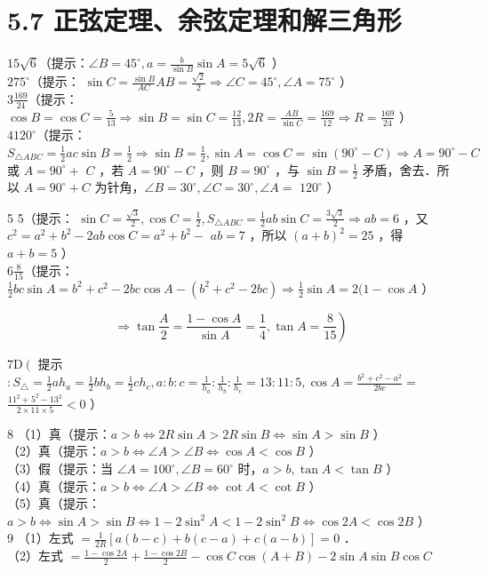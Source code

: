 \documentclass[10pt]{article}
\begin{document}
\section*{5.7 正弦定理、余弦定理和解三角形}
\(15 \sqrt{6}\)（提示：\(\angle B=45^{\circ}, a=\frac{b}{\sin B} \sin A=5 \sqrt{6}\) ）\\
\(275^{\circ}\)（提示： \(\sin C=\frac{\sin B}{A C} A B=\frac{\sqrt{2}}{2} \Rightarrow \angle C=45^{\circ}, \angle A=75^{\circ}\) ）\\
\(3 \frac{169}{24}\)（提示： \(\cos B=\cos C=\frac{5}{13} \Rightarrow \sin B=\sin C=\frac{12}{13}, 2 R=\frac{A B}{\sin C}=\frac{169}{12} \Rightarrow R=\frac{169}{24}\) ）\\
\(4120^{\circ}\)（提示：\(S_{\triangle A B C}=\frac{1}{2} a c \sin B=\frac{1}{2} \Rightarrow \sin B=\frac{1}{2}, \sin A=\cos C=\sin \left(90^{\circ}-C\right) \Rightarrow A=90^{\circ}-C\) 或 \(A=90^{\circ}+\) \(C\) ，若 \(A=90^{\circ}-C\) ，则 \(B=90^{\circ}\) ，与 \(\sin B=\frac{1}{2}\) 矛盾，舍去．所以 \(A=90^{\circ}+C\) 为针角，\(\angle B=30^{\circ}, \angle C=30^{\circ}, \angle A=\) \(120^{\circ}\) ）

5 5（提示： \(\sin C=\frac{\sqrt{3}}{2}, \cos C=\frac{1}{2}, S_{\triangle A B C}=\frac{1}{2} a b \sin C=\frac{3 \sqrt{3}}{2} \Rightarrow a b=6\) ，又 \(c^{2}=a^{2}+b^{2}-2 a b \cos C=a^{2}+b^{2}-\) \(a b=7\) ，所以 \((a+b)^{2}=25\) ，得 \(a+b=5\) ）\\
\(6 \frac{8}{15}\)（提示：\(\frac{1}{2} b c \sin A=b^{2}+c^{2}-2 b c \cos A-\left(b^{2}+c^{2}-2 b c\right) \Rightarrow \frac{1}{2} \sin A=2(1-\cos A\) ）

\[
\left.\Rightarrow \tan \frac{A}{2}=\frac{1-\cos A}{\sin A}=\frac{1}{4}, \tan A=\frac{8}{15}\right)
\]

\(7 \mathrm{D}\left(\right.\) 提示 \(: S_{\triangle}=\frac{1}{2} a h_{a}=\frac{1}{2} b h_{b}=\frac{1}{2} c h_{c}, a: b: c=\frac{1}{h_{a}}: \frac{1}{h_{b}}: \frac{1}{h_{c}}=13: 11: 5, \cos A=\frac{b^{2}+c^{2}-a^{2}}{2 b c}=\) \(\frac{11^{2}+5^{2}-13^{2}}{2 \times 11 \times 5}<0\) ）

8 （1）真（提示：\(a>b \Leftrightarrow 2 R \sin A>2 R \sin B \Leftrightarrow \sin A>\sin B\) ）\\
（2）真（提示：\(a>b \Leftrightarrow \angle A>\angle B \Leftrightarrow \cos A<\cos B\) ）\\
（3）假（提示：当 \(\angle A=100^{\circ}, \angle B=60^{\circ}\) 时，\(a>b, \tan A<\tan B\) ）\\
（4）真（提示：\(a>b \Leftrightarrow \angle A>\angle B \Leftrightarrow \cot A<\cot B\) ）\\
（5）真（提示：\(a>b \Leftrightarrow \sin A>\sin B \Leftrightarrow 1-2 \sin ^{2} A<1-2 \sin ^{2} B \Leftrightarrow \cos 2 A<\cos 2 B\) ）\\
9 （1）左式 \(=\frac{1}{2 R}[a(b-c)+b(c-a)+c(a-b)]=0\) ．\\
（2）左式 \(=\frac{1-\cos 2 A}{2}+\frac{1-\cos 2 B}{2}-\cos C \cos (A+B)-2 \sin A \sin B \cos C\)
\end{document}
